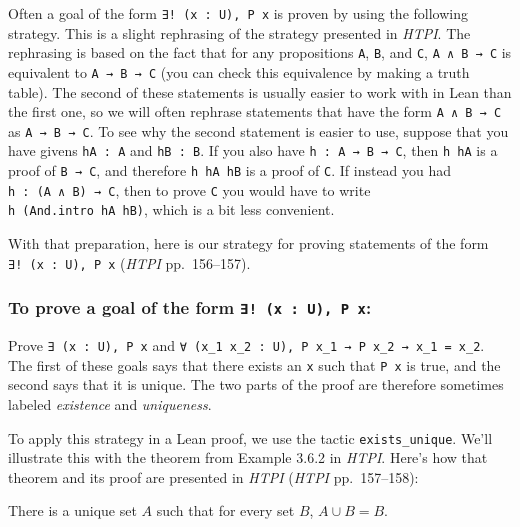 \documentclass[
  letterpaper,
  DIV=11,
  numbers=noendperiod]{scrreprt}
\newenvironment{ind}
	{\begin{list}{}{\setlength{\leftmargin}{1em}}\item\relax}
	{\end{list}}
\theoremstyle{remark}
\begin{document}
Often a goal of the form \texttt{∃!\ (x\ :\ U),\ P\ x} is proven by
using the following strategy. This is a slight rephrasing of the
strategy presented in \emph{HTPI}. The rephrasing is based on the fact
that for any propositions \texttt{A}, \texttt{B}, and \texttt{C},
\texttt{A\ ∧\ B\ →\ C} is equivalent to \texttt{A\ →\ B\ →\ C} (you can
check this equivalence by making a truth table). The second of these
statements is usually easier to work with in Lean than the first one, so
we will often rephrase statements that have the form
\texttt{A\ ∧\ B\ →\ C} as \texttt{A\ →\ B\ →\ C}. To see why the second
statement is easier to use, suppose that you have givens
\texttt{hA\ :\ A} and \texttt{hB\ :\ B}. If you also have
\texttt{h\ :\ A\ →\ B\ →\ C}, then \texttt{h\ hA} is a proof of
\texttt{B\ →\ C}, and therefore \texttt{h\ hA\ hB} is a proof of
\texttt{C}. If instead you had
\texttt{h\textquotesingle{}\ :\ (A\ ∧\ B)\ →\ C}, then to prove
\texttt{C} you would have to write
\texttt{h\textquotesingle{}\ (And.intro\ hA\ hB)}, which is a bit less
convenient.

With that preparation, here is our strategy for proving statements of
the form \texttt{∃!\ (x\ :\ U),\ P\ x} (\emph{HTPI} pp.~156--157).

\hypertarget{to-prove-a-goal-of-the-form-x-u-p-x-2}{%
\subsubsection{\texorpdfstring{To prove a goal of the form
\texttt{∃!\ (x\ :\ U),\ P\ x}:}{To prove a goal of the form ∃! (x : U), P x:}}\label{to-prove-a-goal-of-the-form-x-u-p-x-2}}

\begin{ind}
Prove \texttt{∃\ (x\ :\ U),\ P\ x} and
\texttt{∀\ (x\_1\ x\_2\ :\ U),\ P\ x\_1\ →\ P\ x\_2\ →\ x\_1\ =\ x\_2}.
The first of these goals says that there exists an \texttt{x} such that
\texttt{P\ x} is true, and the second says that it is unique. The two
parts of the proof are therefore sometimes labeled \emph{existence} and
\emph{uniqueness}.

\end{ind}

To apply this strategy in a Lean proof, we use the tactic
\texttt{exists\_unique}. We'll illustrate this with the theorem from
Example 3.6.2 in \emph{HTPI}. Here's how that theorem and its proof are
presented in \emph{HTPI} (\emph{HTPI} pp.~157--158):

\begin{thm}
There is a unique set \(A\) such that for every set \(B\),
\(A \cup B = B\).

\end{thm}
\end{document}
